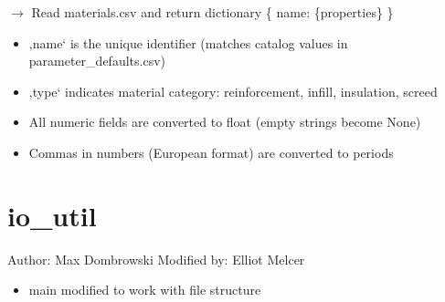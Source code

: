\documentclass[a4paper,11pt,german]{sphinxmanual}
\begin{document}

\begin{fulllineitems}
\label{\detokenize{api/ioh_core:core.ioh_core.import_specs.load_materials_registry}}
\pysigstartsignatures
\pysiglinewithargsret
{}
{}
{{ $\rightarrow$ \DUrole{p}{{[}}\DUrole{p}{{]}}}}
\pysigstopsignatures
\sphinxAtStartPar
Read materials.csv and return dictionary \{ name: \{properties\} \}
\begin{description}
\begin{itemize}
\item {} 
\sphinxAtStartPar
‚name‘ is the unique identifier (matches catalog values in parameter\_defaults.csv)

\item {} 
\sphinxAtStartPar
‚type‘ indicates material category: reinforcement, infill, insulation, screed

\item {} 
\sphinxAtStartPar
All numeric fields are converted to float (empty strings become None)

\item {} 
\sphinxAtStartPar
Commas in numbers (European format) are converted to periods

\end{itemize}

\end{description}

\end{fulllineitems}



\section{io\_util}
\label{\detokenize{api/ioh_core:module-core.ioh_core.io_util}}\label{\detokenize{api/ioh_core:io-util}}
\sphinxAtStartPar
Author: Max Dombrowski
Modified by: Elliot Melcer
\begin{itemize}
\item {} 
\sphinxAtStartPar
main modified to work with file structure

\end{itemize}
\end{document}
